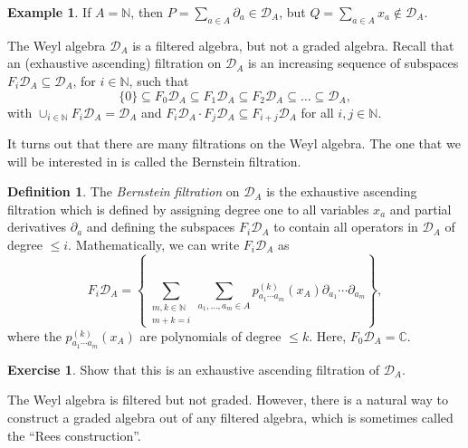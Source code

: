 \documentclass[reqno,oneside,11pt]{amsart}
\theoremstyle{plain}
\theoremstyle{definition}
\newtheorem{definition}[theorem]{Definition}
\newtheorem{example}[theorem]{Example}
\newtheorem*{exercise}{Exercise}
\theoremstyle{remark}
\numberwithin{equation}{section}
\newcommand{\DA}{\mathcal{D}_A}
\begin{document}
\begin{example}
If $A = \mathbb{N}$, then $P = \sum_{a \in A} \partial_a \in \DA$, but $Q = \sum_{a \in A} x_a \notin \DA$. 
\end{example}

The Weyl algebra $\mathcal{D}_A$ is a filtered algebra, but not a graded algebra. Recall that an (exhaustive ascending) filtration on $\mathcal{D}_A$ is an increasing sequence of subspaces $F_i \mathcal{D}_A \subseteq \mathcal{D}_A$, for $i \in \mathbb{N}$, such that
\begin{equation}
\{0\} \subseteq F_0 \mathcal{D}_A \subseteq F_1 \mathcal{D}_A \subseteq F_2 \mathcal{D}_A \subseteq \ldots \subseteq \mathcal{D}_A,
\end{equation}
with $ \cup_{i \in \mathbb{N}} F_i \mathcal{D}_A = \mathcal{D}_A$ and $F_i \mathcal{D}_A \cdot F_j \mathcal{D}_A \subseteq F_{i+j} \mathcal{D}_A$ for all $i,j \in \mathbb{N}$.

It turns out that there are many filtrations on the Weyl algebra. The one that we will be interested in is called the Bernstein filtration.

\begin{definition}\label{d:bernstein}
The \emph{Bernstein filtration} on $\DA$ is the exhaustive ascending filtration
 which  is defined by assigning degree one to all variables $ x_a $ and partial derivatives $ \partial_a $ and defining the subspaces $ F_i \mathcal D_A $ to contain all operators in $ \mathcal D_A $ of degree $ \leq i $. Mathematically, we can write
$F_i \mathcal{D}_A$ as
\begin{equation}
 F_i \mathcal{D}_A = \left \{ \sum_{\substack{m, k \in \mathbb{N} \\ m+k = i}} \sum_{a_1, \ldots, a_m \in A} p_{a_1 \cdots a_m}^{(k)}(x_A) \partial_{a_1} \cdots \partial_{a_m} \right \},
\end{equation}
where the $ p_{a_1 \cdots a_m}^{(k)}(x_A)$ are polynomials of degree $\leq k$.
 Here, $F_0 \mathcal{D}_A = \mathbb{C}$.
\end{definition}

\begin{exercise}
Show that this is an exhaustive ascending filtration of $\mathcal{D}_A$.
\end{exercise}

The Weyl algebra is filtered but not graded. However, there is a natural way to construct a graded algebra out of any filtered algebra, which is sometimes called the ``Rees construction''.
\end{document}
